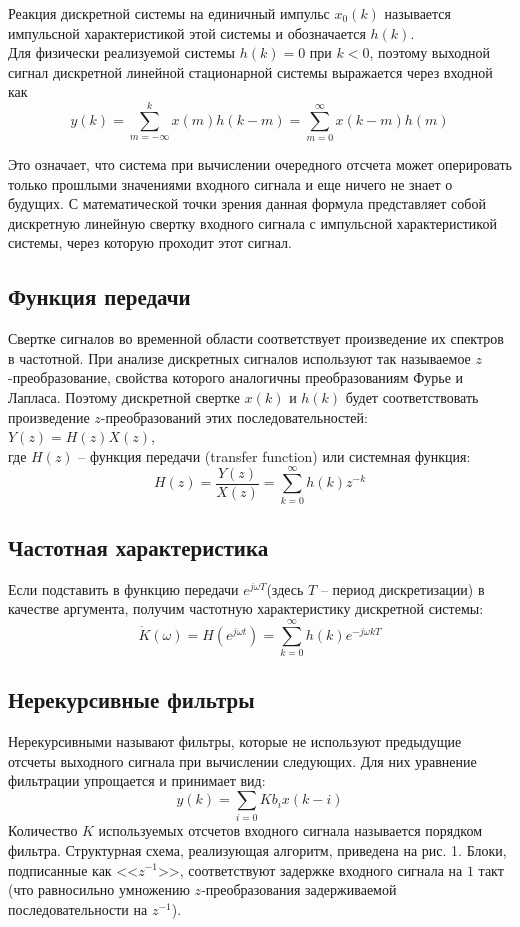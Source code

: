 \documentclass[a4paper]{article}
\begin{document}
Реакция дискретной системы на единичный импульс $x_0(k)$ называется импульсной характеристикой этой системы и обозначается $h(k)$.\\
Для физически реализуемой системы $h(k)=0$ при $k<0$, поэтому выходной сигнал дискретной линейной стационарной системы выражается через входной как
$$y(k)=\sum_{m=-\infty}^{k}x(m)h(k-m)=\sum_{m=0}^{\infty}x(k-m)h(m)$$

Это означает, что система при вычислении очередного отсчета может оперировать только прошлыми значениями входного сигнала и еще ничего не знает о будущих. С математической точки зрения данная формула представляет собой дискретную линейную свертку входного сигнала с импульсной характеристикой системы, через которую проходит этот сигнал.
\subsection{Функция передачи}
Свертке сигналов во временной области соответствует произведение их спектров в частотной. При анализе дискретных сигналов используют так называемое $z$-преобразование, свойства которого аналогичны преобразованиям Фурье и Лапласа. Поэтому дискретной свертке $x(k)$ и $h(k)$ будет соответствовать произведение $z$-преобразований этих последовательностей:\\
$Y(z)=H(z)X(z)$,\\
где $H(z)$ -- функция передачи (transfer function) или системная функция:
$$H(z)=\frac{Y(z)}{X(z)}=\sum_{k=0}^{\infty}h(k)z^{-k}$$
\subsection{Частотная характеристика}
Если подставить в функцию передачи $e^{j\omega T}$(здесь $T$ -- период дискретизации) в качестве аргумента, получим частотную характеристику дискретной системы:
$$\dot{K}(\omega)=H(e^{j\omega t})=\sum_{k=0}^{\infty}h(k)e^{-j\omega kT}$$

\subsection{Нерекурсивные фильтры}
Нерекурсивными называют фильтры, которые не используют предыдущие отсчеты выходного сигнала при вычислении следующих. Для них уравнение фильтрации упрощается и принимает вид:
$$y(k)=\sum_{i=0}Kb_ix(k − i)$$
Количество $K$ используемых отсчетов входного сигнала называется порядком фильтра. Структурная схема, реализующая алгоритм, приведена на рис. 1. Блоки, подписанные как <<$z^{-1}$>>, соответствуют задержке входного сигнала на $1$ такт (что равносильно умножению $z$-преобразования задерживаемой последовательности на $z^{-1}$).\\
\end{document}
